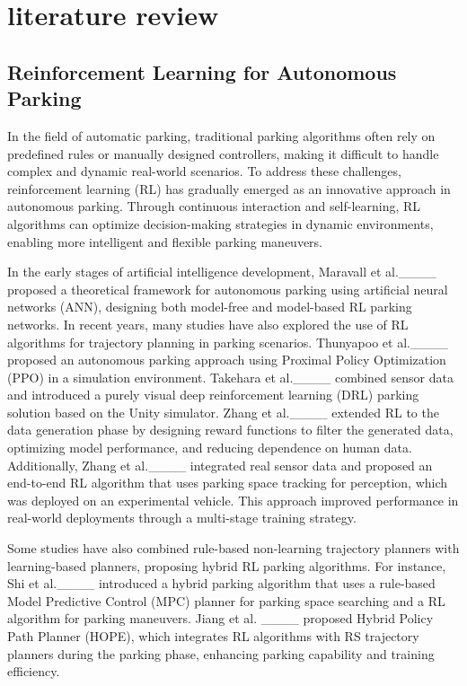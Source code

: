 \section{literature review}
\subsection{Reinforcement Learning for Autonomous  Parking}
In the field of automatic parking, traditional parking algorithms often rely on predefined rules or manually designed controllers, making it difficult to handle complex and dynamic real-world scenarios. 
To address these challenges, reinforcement learning (RL) has gradually emerged as an innovative approach in autonomous parking. 
Through continuous interaction and self-learning, RL algorithms can optimize decision-making strategies in dynamic environments, enabling more intelligent and flexible parking maneuvers.

In the early stages of artificial intelligence development, Maravall et al.____ proposed a theoretical framework for autonomous parking using artificial neural networks (ANN), designing both model-free and model-based RL parking networks. 
In recent years, many studies have also explored the use of RL algorithms for trajectory planning in parking scenarios. 
Thunyapoo et al.____ proposed an autonomous parking approach using Proximal Policy Optimization (PPO) in a simulation environment. 
Takehara et al.____ combined sensor data and introduced a purely visual deep reinforcement learning (DRL) parking solution based on the Unity simulator. 
Zhang et al.____ extended RL to the data generation phase by designing reward functions to filter the generated data, optimizing model performance, and reducing dependence on human data. Additionally, Zhang et al.____ integrated real sensor data and proposed an end-to-end RL algorithm that uses parking space tracking for perception, which was deployed on an experimental vehicle. This approach improved performance in real-world deployments through a multi-stage training strategy.

Some studies have also combined rule-based non-learning trajectory planners with learning-based planners, proposing hybrid RL parking algorithms. 
For instance, Shi et al.____ introduced a hybrid parking algorithm that uses a rule-based Model Predictive Control (MPC) planner for parking space searching and a RL algorithm for parking maneuvers. 
Jiang et al. ____ proposed Hybrid Policy Path Planner (HOPE), which integrates RL algorithms with RS trajectory planners during the parking phase, enhancing parking capability and training efficiency.

